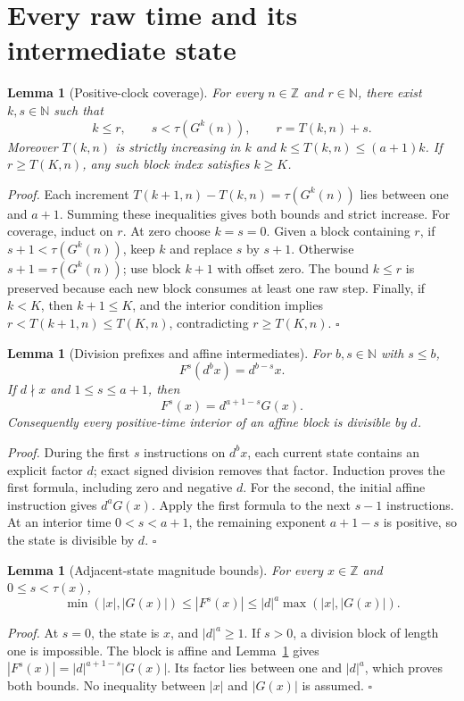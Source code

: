 \documentclass[11pt,letterpaper]{article}
\newcommand{\N}{\mathbb{N}}
\newcommand{\Z}{\mathbb{Z}}
\newtheorem{lemma}[theorem]{Lemma}
\newenvironment{proof}{\noindent\textit{Proof.}}{\hfill\(\square\)}
\begin{document}
\section{Every raw time and its intermediate state}

\begin{lemma}[Positive-clock coverage]\label{ClockCover}
For every \(n\in\Z\) and \(r\in\N\), there exist \(k,s\in\N\) such that
\[
k\le r,\qquad s<\tau(G^k(n)),\qquad r=T(k,n)+s.
\]
Moreover \(T(k,n)\) is strictly increasing in \(k\) and
\(k\le T(k,n)\le(a+1)k\). If \(r\ge T(K,n)\), any such block index satisfies
\(k\ge K\).
\end{lemma}
\begin{proof}
Each increment \(T(k+1,n)-T(k,n)=\tau(G^k(n))\) lies between one and \(a+1\).
Summing these inequalities gives both bounds and strict increase. For coverage,
induct on \(r\). At zero choose \(k=s=0\). Given a block containing \(r\),
if \(s+1<\tau(G^k(n))\), keep \(k\) and replace \(s\) by \(s+1\).
Otherwise \(s+1=\tau(G^k(n))\); use block \(k+1\) with offset zero.
The bound \(k\le r\) is preserved because each new block consumes at least
one raw step. Finally, if \(k<K\), then \(k+1\le K\), and the interior
condition implies \(r<T(k+1,n)\le T(K,n)\), contradicting \(r\ge T(K,n)\).
\end{proof}

\begin{lemma}[Division prefixes and affine intermediates]\label{Intermediates}
For \(b,s\in\N\) with \(s\le b\),
\[
F^s(d^b x)=d^{b-s}x.
\]
If \(d\nmid x\) and \(1\le s\le a+1\), then
\[
F^s(x)=d^{a+1-s}G(x).
\]
Consequently every positive-time interior of an affine block is divisible by
\(d\).
\end{lemma}
\begin{proof}
During the first \(s\) instructions on \(d^b x\), each current state contains
an explicit factor \(d\); exact signed division removes that factor. Induction
proves the first formula, including zero and negative \(d\).
For the second, the initial affine instruction gives \(d^aG(x)\).
Apply the first formula to the next \(s-1\) instructions. At an interior time
\(0<s<a+1\), the remaining exponent \(a+1-s\) is positive, so the state is
divisible by \(d\).
\end{proof}

\begin{lemma}[Adjacent-state magnitude bounds]\label{MagnitudeBounds}
For every \(x\in\Z\) and \(0\le s<\tau(x)\),
\[
\min(|x|,|G(x)|)\le |F^s(x)|
\le |d|^a\max(|x|,|G(x)|).
\]
\end{lemma}
\begin{proof}
At \(s=0\), the state is \(x\), and \(|d|^a\ge1\). If \(s>0\), a
division block of length one is impossible. The block is affine and
Lemma~\ref{Intermediates} gives
\(|F^s(x)|=|d|^{a+1-s}|G(x)|\). Its factor lies between one and \(|d|^a\),
which proves both bounds. No inequality between \(|x|\) and \(|G(x)|\) is assumed.
\end{proof}
\end{document}
